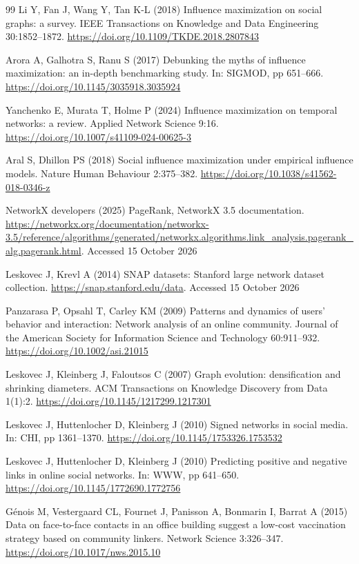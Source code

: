 \documentclass[smallextended]{svjour3}
\begin{document}
\begin{thebibliography}{99}
 Li Y, Fan J, Wang Y, Tan K-L (2018) Influence maximization on social graphs: a survey. IEEE Transactions on Knowledge and Data Engineering 30:1852--1872. \url{https://doi.org/10.1109/TKDE.2018.2807843}

 Arora A, Galhotra S, Ranu S (2017) Debunking the myths of influence maximization: an in-depth benchmarking study. In: SIGMOD, pp 651--666. \url{https://doi.org/10.1145/3035918.3035924}

 Yanchenko E, Murata T, Holme P (2024) Influence maximization on temporal networks: a review. Applied Network Science 9:16. \url{https://doi.org/10.1007/s41109-024-00625-3}

 Aral S, Dhillon PS (2018) Social influence maximization under empirical influence models. Nature Human Behaviour 2:375--382. \url{https://doi.org/10.1038/s41562-018-0346-z}

 NetworkX developers (2025) PageRank, NetworkX 3.5 documentation. \url{https://networkx.org/documentation/networkx-3.5/reference/algorithms/generated/networkx.algorithms.link_analysis.pagerank_alg.pagerank.html}. Accessed 15 October 2026

 Leskovec J, Krevl A (2014) SNAP datasets: Stanford large network dataset collection. \url{https://snap.stanford.edu/data}. Accessed 15 October 2026

 Panzarasa P, Opsahl T, Carley KM (2009) Patterns and dynamics of users' behavior and interaction: Network analysis of an online community. Journal of the American Society for Information Science and Technology 60:911--932. \url{https://doi.org/10.1002/asi.21015}

 Leskovec J, Kleinberg J, Faloutsos C (2007) Graph evolution: densification and shrinking diameters. ACM Transactions on Knowledge Discovery from Data 1(1):2. \url{https://doi.org/10.1145/1217299.1217301}

 Leskovec J, Huttenlocher D, Kleinberg J (2010) Signed networks in social media. In: CHI, pp 1361--1370. \url{https://doi.org/10.1145/1753326.1753532}

 Leskovec J, Huttenlocher D, Kleinberg J (2010) Predicting positive and negative links in online social networks. In: WWW, pp 641--650. \url{https://doi.org/10.1145/1772690.1772756}

 Génois M, Vestergaard CL, Fournet J, Panisson A, Bonmarin I, Barrat A (2015) Data on face-to-face contacts in an office building suggest a low-cost vaccination strategy based on community linkers. Network Science 3:326--347. \url{https://doi.org/10.1017/nws.2015.10}


\end{thebibliography}
\end{document}
